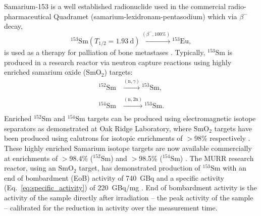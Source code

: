 \documentclass[../main.tex]{subfiles}
\begin{document}
Samarium-153 is a well established radionuclide used in the commercial radio-pharmaceutical Quadramet \cite{ema2015quadramet} (samarium-lexidronam-pentasodium) which via $\beta^{-}$ decay,
\begin{equation}
^{153}\mathrm{Sm} \left(T_{1/2} = 1.93~\mathrm{\si{\day}}\right)\xrightarrow[]{\left(\beta^{-},\mathrm{100\%}\right)} {}^{153}\mathrm{Eu},
\label{eq:153Sm_beta_minus_decay}    
\end{equation}
is used as a therapy for palliation of bone metastases \cite{kapoor2021cancer,murray2021systemic}. Typically, $^{153}\mathrm{Sm}$ is produced in a research reactor via neutron capture reactions using highly enriched samarium oxide ($\mathrm{SmO}_{2}$) targets: 
\begin{align}
^{152}\mathrm{Sm}&\xrightarrow[]{\left(\mathrm{n},\gamma\right)}{}^{153}\mathrm{Sm}, \\
^{154}\mathrm{Sm}&\xrightarrow[]{\left(\mathrm{n},2\mathrm{n}\right)}{}^{153}\mathrm{Sm}.
\label{eq:153Sm_research_reactor_production}
\end{align}
Enriched $^{152}\mathrm{Sm}$ and $^{154}\mathrm{Sm}$ targets can be produced using electromagnetic isotope separators as demonstrated at Oak Ridge Laboratory, where $\mathrm{SmO}_{2}$ targets have been produced using calutrons for isotopic enrichments of $>$98\% respectively \cite{bell1987stable}. These highly enriched Samarium isotope targets are now available commercially at enrichments of $>$98.4\% ($^{152}\mathrm{Sm}$) and $>$98.5\% ($^{154}\mathrm{Sm}$) \cite{isoflex2021sm}. The MURR research reactor, using an $\mathrm{SmO}_{2}$ target, has demonstrated production of $^{153}\mathrm{Sm}$ with an end of bombardment (EoB) activity of 740~\si{\giga\becquerel} and a specific activity (Eq.~\ref{eq:specific_activity}) of 220~\si{\giga\becquerel}/\si{\milli\gram} \cite{ma1996production}. End of bombardment activity is the activity of the sample directly after irradiation -- the peak activity of the sample -- calibrated for the reduction in activity over the measurement time. 
\end{document}
